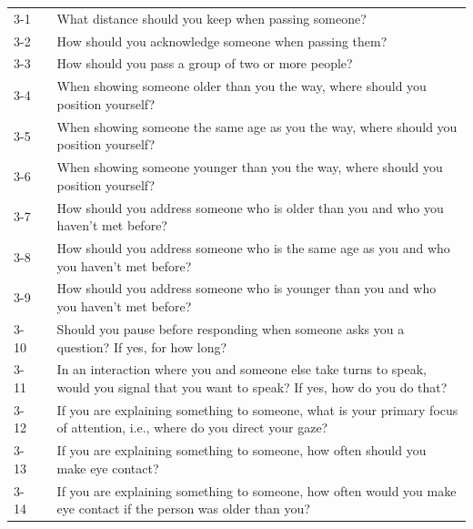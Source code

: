\documentclass{CSSRforAfrica}
\begin{document}
\begin{table}[thb]
\begin{center}
\begin{tabularx}{\linewidth}{|l c|X|}
\hline \hline
 {\small 3-1 }  & {\small} & {\small  What distance should you keep when passing someone?}\\
 {\small 3-2 } & {\small}  & {\small  How should you acknowledge someone when passing them?}\\
 {\small 3-3 }  & {\small} & {\small  How should you pass a group of two or more people?}\\
 {\small 3-4 }  & {\small} & {\small  When showing someone older than you the way, where should you position yourself?}\\
 {\small 3-5 }  & {\small} & {\small  When showing someone the same age as you the way, where should you position yourself?}\\
 {\small 3-6 }  & {\small} & {\small  When showing someone younger than you the way, where should you position yourself?}\\
 {\small 3-7}  & {\small } & {\small How should you address someone who is older than you and who you haven't met before?}\\
 {\small 3-8 } & {\small }  & {\small  How should you address someone who is the same age as you and who you haven't met before?}\\
 {\small 3-9}  & {\small }  & {\small  How should you address someone who is younger than you and who you haven't met before?}\\
 {\small 3-10} & {\small}  & {\small  Should you pause before responding when someone asks you a question? If yes, for how long?}\\
 {\small 3-11 } & {\small}  & {\small  In an interaction where you and someone else take turns to speak, would you signal that you want to speak? If yes, how do you do that?}\\
 {\small 3-12 } & {\small}  & {\small  If you are explaining something to someone, what is your primary focus of attention, i.e., where do you direct your gaze?}\\
 {\small 3-13}  & {\small} & {\small If you are explaining something to someone, how often should you make eye contact?}\\
 {\small 3-14}  & {\small} & {\small If you are explaining something to someone, how often would you make eye contact if the person was older than you?}\\

\end{tabularx}
\end{center}
\end{table}
\end{document}
